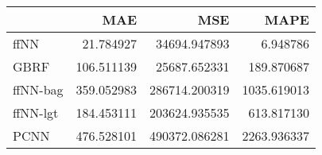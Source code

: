 \begin{tabular}{lrrr}
\toprule
{} &         MAE &            MSE &         MAPE \\
\midrule
ffNN     &   21.784927 &   34694.947893 &     6.948786 \\
GBRF     &  106.511139 &   25687.652331 &   189.870687 \\
ffNN-bag &  359.052983 &  286714.200319 &  1035.619013 \\
ffNN-lgt &  184.453111 &  203624.935535 &   613.817130 \\
PCNN     &  476.528101 &  490372.086281 &  2263.936337 \\
\bottomrule
\end{tabular}
